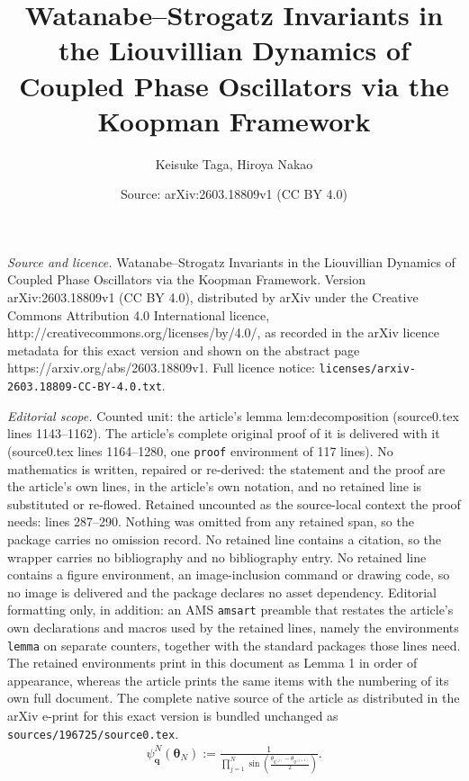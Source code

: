 \documentclass[10pt,a4paper]{amsart}
\title{Watanabe--Strogatz Invariants in the Liouvillian Dynamics of Coupled Phase Oscillators via the Koopman Framework}
\author{Keisuke Taga, Hiroya Nakao}
\date{Source: arXiv:2603.18809v1 (CC BY 4.0)}
\begin{document}
\maketitle

\noindent\emph{Source and licence.} Watanabe--Strogatz Invariants in the Liouvillian Dynamics of Coupled Phase Oscillators via the Koopman Framework. Version arXiv:2603.18809v1 (CC BY 4.0), distributed by arXiv under the Creative Commons Attribution 4.0 International licence, http://creativecommons.org/licenses/by/4.0/, as recorded in the arXiv licence metadata for this exact version and shown on the abstract page https://arxiv.org/abs/2603.18809v1. Full licence notice: \texttt{licenses/arxiv-2603.18809-CC-BY-4.0.txt}.\par\smallskip

\noindent\textit{Editorial scope.} Counted unit: the article's lemma lem:decomposition (source0.tex lines 1143--1162). The article's complete original proof of it is delivered with it (source0.tex lines 1164--1280, one \texttt{proof} environment of 117 lines). No mathematics is written, repaired or re-derived: the statement and the proof are the article's own lines, in the article's own notation, and no retained line is substituted or re-flowed.  Retained uncounted as the source-local context the proof needs: lines 287--290.  Nothing was omitted from any retained span, so the package carries no omission record.  No retained line contains a citation, so the wrapper carries no bibliography and no bibliography entry.  No retained line contains a figure environment, an image-inclusion command or drawing code, so no image is delivered and the package declares no asset dependency.  Editorial formatting only, in addition: an AMS \texttt{amsart} preamble that restates the article's own declarations and macros used by the retained lines, namely the environments \texttt{lemma} on separate counters, together with the standard packages those lines need.  The retained environments print in this document as Lemma 1 in order of appearance, whereas the article prints the same items with the numbering of its own full document.  The complete native source of the article as distributed in the arXiv e-print for this exact version is bundled unchanged as \texttt{sources/196725/source0.tex}.
\begin{align}
    \label{eq:eigenfunction}
	\psi_{\bm{q}}^N(\bm{\theta}_N) := \frac{1}{\prod_{j=1}^N \sin\left( \frac{\theta_{q^{(j)}} - \theta_{q^{(j+1)}}}{2} \right)}.
\end{align}
\end{document}
